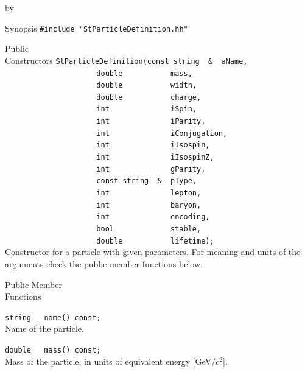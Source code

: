 \documentclass[twoside]{article}
\newcommand{\entrylabel}[1]{\mbox{\textbf{{#1}}}\hfil}%
\newenvironment{entry}
{\begin{list}{}%
    {\renewcommand{\makelabel}{\entrylabel}%
     \setlength{\labelwidth}{90pt}%
     \setlength{\leftmargin}{\labelwidth}
     \advance\leftmargin by \labelsep%
      }%
    }%
  {\end{list}}
\newcommand{\Entrylabel}[1]%
{\raisebox{0pt}[1ex][0pt]{\makebox[\labelwidth][l]%
    {\parbox[t]{\labelwidth}{\hspace{0pt}\textbf{{#1}}}}}}
\newenvironment{Entry}%
{\renewcommand{\entrylabel}{\Entrylabel}\begin{entry}}%
  {\end{entry}}
\begin{document}
\begin{Entry}
\item[Synopsis]
    \verb+#include "StParticleDefinition.hh"+\\    
    
\item[Public\\ Constructors]
    \verb+StParticleDefinition(const string  &  aName,+\\  
    \verb+                     double           mass,+\\      
    \verb+                     double           width,+\\ 
    \verb+                     double           charge,+\\    
    \verb+                     int              iSpin,+\\ 
    \verb+                     int              iParity,+\\ 
    \verb+                     int              iConjugation,+\\ 
    \verb+                     int              iIsospin,+\\    
    \verb+                     int              iIsospinZ,+\\  
    \verb+                     int              gParity,+\\ 
    \verb+                     const string  &  pType,+\\ 
    \verb+                     int              lepton,+\\ 
    \verb+                     int              baryon,+\\ 
    \verb+                     int              encoding,+\\ 
    \verb+                     bool             stable,+\\ 
    \verb+                     double           lifetime);+\\ 
    Constructor for a particle with given parameters. For meaning and units
    of the arguments check the public member functions below.
    
\item[Public Member\\ Functions]
   
    \verb+string   name() const;+\\
    Name of the particle.
    
    \verb+double   mass() const;+\\
    Mass of the particle, in units of equivalent energy [GeV/$c^2$].
    

\end{Entry}
\end{document}
